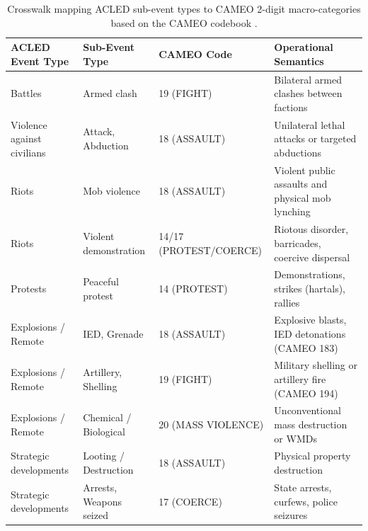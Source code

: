 \documentclass[11pt,a4paper]{article}
\begin{document}
\begin{table}[h]
\centering
\small
\caption{Crosswalk mapping ACLED sub-event types to CAMEO 2-digit macro-categories based on the CAMEO codebook \citep{schrodt2012}.}
\label{tab:acled_crosswalk}
\begin{tabular}{lllp{6.5cm}}
\toprule
\textbf{ACLED Event Type} & \textbf{Sub-Event Type} & \textbf{CAMEO Code} & \textbf{Operational Semantics} \\
\midrule
Battles                   & Armed clash             & 19 (FIGHT)          & Bilateral armed clashes between factions \\
Violence against civilians & Attack, Abduction       & 18 (ASSAULT)        & Unilateral lethal attacks or targeted abductions \\
Riots                     & Mob violence            & 18 (ASSAULT)        & Violent public assaults and physical mob lynching \\
Riots                     & Violent demonstration   & 14/17 (PROTEST/COERCE) & Riotous disorder, barricades, coercive dispersal \\
Protests                  & Peaceful protest        & 14 (PROTEST)        & Demonstrations, strikes (hartals), rallies \\
Explosions / Remote       & IED, Grenade            & 18 (ASSAULT)        & Explosive blasts, IED detonations (CAMEO 183) \\
Explosions / Remote       & Artillery, Shelling     & 19 (FIGHT)          & Military shelling or artillery fire (CAMEO 194) \\
Explosions / Remote       & Chemical / Biological   & 20 (MASS VIOLENCE)  & Unconventional mass destruction or WMDs \\
Strategic developments    & Looting / Destruction   & 18 (ASSAULT)        & Physical property destruction \\
Strategic developments    & Arrests, Weapons seized & 17 (COERCE)         & State arrests, curfews, police seizures \\
\bottomrule
\end{tabular}
\end{table}
\end{document}

